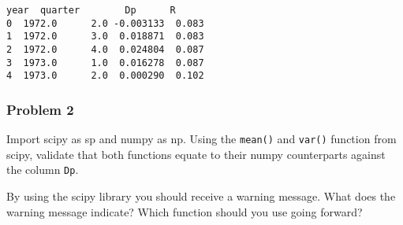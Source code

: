 \documentclass[11pt]{article}
\makeatletter
\newcommand{\boxspacing}{\kern\kvtcb@left@rule\kern\kvtcb@boxsep}
\newcommand{\prompt}[4]{
        {\ttfamily\llap{{\color{#2}[#3]:\hspace{3pt}#4}}\vspace{-\baselineskip}}
    }
\makeatother
\begin{document}
            \begin{tcolorbox}[breakable, size=fbox, boxrule=.5pt, pad at break*=1mm, opacityfill=0]
\prompt{Out}{outcolor}{26}{\boxspacing}
\begin{Verbatim}[commandchars=\\\{\}]
     year  quarter        Dp      R
0  1972.0      2.0 -0.003133  0.083
1  1972.0      3.0  0.018871  0.083
2  1972.0      4.0  0.024804  0.087
3  1973.0      1.0  0.016278  0.087
4  1973.0      2.0  0.000290  0.102
\end{Verbatim}
\end{tcolorbox}
        
    \hypertarget{problem-2}{%
\subsubsection{Problem 2}\label{problem-2}}

Import scipy as sp and numpy as np. Using the \texttt{mean()} and
\texttt{var()} function from scipy, validate that both functions equate
to their numpy counterparts against the column \texttt{Dp}.

By using the scipy library you should receive a warning message. What
does the warning message indicate? Which function should you use going
forward?
\end{document}
